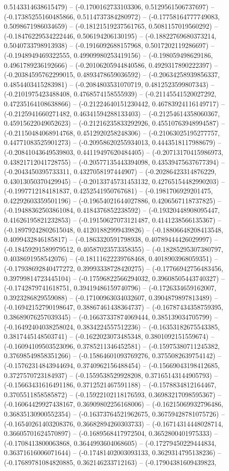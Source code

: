 0.5143314638615479) -- (-0.1700162733103306, 0.5129561506737697) -- (-0.17385255160485866, 0.5114737384280972) -- (-0.17758164777749083, 0.5098671986034659) -- (-0.18121519237561765, 0.5081157019560292) -- (-0.18476229534222446, 0.506194206130195) -- (-0.18822769680373214, 0.5040733798913938) -- (-0.1916092688157968, 0.5017202119286697) -- (-0.1948949469322555, 0.49909980253419156) -- (-0.198059498629186, 0.4961789236192666) -- (-0.20106205944840586, 0.4929317890222397) -- (-0.20384595762299015, 0.4893478659036592) -- (-0.20634258939856337, 0.4854403415283981) -- (-0.2084803531070719, 0.4812523599807343) -- (-0.2101975423488408, 0.4768574158555939) -- (-0.21145541520027292, 0.47235164108638866) -- (-0.21224640151230442, 0.46783924116149717) -- (-0.2125941660271482, 0.46341594288133403) -- (-0.21254614358060367, 0.45915622049052623) -- (-0.21216235833292926, 0.45510763948994587) -- (-0.21150484068914768, 0.4512920258248306) -- (-0.21063025195277757, 0.44771083525901273) -- (-0.20958620255934013, 0.4443518117988679) -- (-0.20841043649539803, 0.44119497620484405) -- (-0.20713170415986973, 0.43821712041728755) -- (-0.20577135443394098, 0.43539475637677394) -- (-0.2043450395733311, 0.4327058197444907) -- (-0.20286423314876229, 0.43013050370429945) -- (-0.20133745731453132, 0.42765154482990203) -- (-0.1997712184181837, 0.4252541950767681) -- (-0.1981706929201475, 0.42292603359501196) -- (-0.19654021644027886, 0.4206567118737825) -- (-0.19488362503861084, 0.4184376852238592) -- (-0.19320448908095447, 0.41626195821232853) -- (-0.19150627073121487, 0.4141238566135367) -- (-0.18979242802615048, 0.41201882999439826) -- (-0.18806648208413548, 0.4099432846185817) -- (-0.1863320591798938, 0.40789444426029997) -- (-0.18459291589979512, 0.40587023573358355) -- (-0.18285295307380797, 0.4038691958542076) -- (-0.18111622239768468, 0.4018903968059351) -- (-0.17938692840477272, 0.39993338728420275) -- (-0.17766942756483456, 0.39799814723445104) -- (-0.17596822566294032, 0.39608505443740327) -- (-0.1742879741618751, 0.39419486159740796) -- (-0.1726334659162007, 0.3923286829559088) -- (-0.17100963034032607, 0.3904879897813489) -- (-0.16942152790198647, 0.38867461438364737) -- (-0.16787434358759395, 0.38689076257039345) -- (-0.16637337874069444, 0.385139034705799) -- (-0.16492404038258024, 0.3834224557512236) -- (-0.16353182675543385, 0.3817445148503741) -- (-0.1622023073485348, 0.3801092151559674) -- (-0.16094109503523096, 0.3785211346452581) -- (-0.15975380711245382, 0.37698549858351266) -- (-0.15864601093769276, 0.3755082639754142) -- (-0.15762314843944694, 0.3740962156488454) -- (-0.15669043198412685, 0.3727570723184937) -- (-0.1559538529928208, 0.37165143144905793) -- (-0.15663431616491186, 0.3712521467591188) -- (-0.1578834812164467, 0.3705511858585872) -- (-0.15922102118176593, 0.36983217098595367) -- (-0.16064429927438167, 0.36909802256168006) -- (-0.16215069932796486, 0.36835130900552354) -- (-0.16373764521962675, 0.36759428781075726) -- (-0.16540261403208376, 0.36682894260303733) -- (-0.16714314448028714, 0.36605701624570897) -- (-0.1689568417972504, 0.3652800401975333) -- (-0.1708413800063868, 0.3644993604068605) -- (-0.17279450229444834, 0.36371616006071644) -- (-0.17481402003093133, 0.3629314795138236) -- (-0.17689781084820885, 0.362146233712163) -- (-0.17904381609439823, 